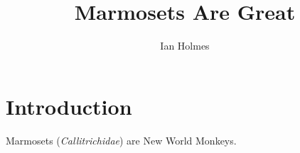 \documentclass{article}
\title{Marmosets Are Great}
\author{Ian Holmes}
\begin{document}
\maketitle
{}

\section{Introduction}
Marmosets ({\em Callitrichidae}) are New World Monkeys.
\end{document}
